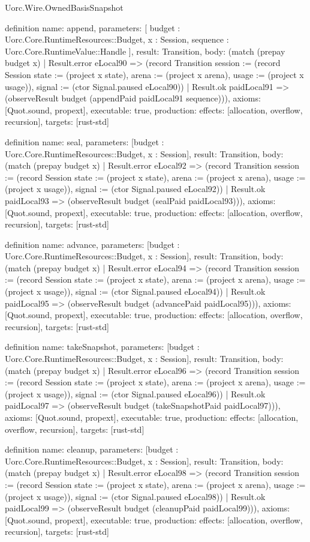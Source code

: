 \begin{lexlean}{Uorc.Wire.OwnedBasisSnapshot}
\begin{semanticmodule}
definition{
  name: append,
  parameters: [
    budget : Uorc.Core.RuntimeResources::Budget,
    x : Session,
    sequence : Uorc.Core.RuntimeValue::Handle
  ],
  result: Transition,
  body: (match (prepay budget x)
    | Result.error eLocal90 => (record Transition {session := (record Session {state := (project x state), arena := (project x arena), usage := (project x usage)}), signal := (ctor Signal.paused eLocal90)})
    | Result.ok paidLocal91 => (observeResult budget (appendPaid paidLocal91 sequence))),
  axioms: [Quot.sound, propext],
  executable: true,
  production: {effects: [allocation, overflow, recursion], targets: [rust-std]}
}

definition{
  name: seal,
  parameters: [budget : Uorc.Core.RuntimeResources::Budget, x : Session],
  result: Transition,
  body: (match (prepay budget x)
    | Result.error eLocal92 => (record Transition {session := (record Session {state := (project x state), arena := (project x arena), usage := (project x usage)}), signal := (ctor Signal.paused eLocal92)})
    | Result.ok paidLocal93 => (observeResult budget (sealPaid paidLocal93))),
  axioms: [Quot.sound, propext],
  executable: true,
  production: {effects: [allocation, overflow, recursion], targets: [rust-std]}
}

definition{
  name: advance,
  parameters: [budget : Uorc.Core.RuntimeResources::Budget, x : Session],
  result: Transition,
  body: (match (prepay budget x)
    | Result.error eLocal94 => (record Transition {session := (record Session {state := (project x state), arena := (project x arena), usage := (project x usage)}), signal := (ctor Signal.paused eLocal94)})
    | Result.ok paidLocal95 => (observeResult budget (advancePaid paidLocal95))),
  axioms: [Quot.sound, propext],
  executable: true,
  production: {effects: [allocation, overflow, recursion], targets: [rust-std]}
}

definition{
  name: takeSnapshot,
  parameters: [budget : Uorc.Core.RuntimeResources::Budget, x : Session],
  result: Transition,
  body: (match (prepay budget x)
    | Result.error eLocal96 => (record Transition {session := (record Session {state := (project x state), arena := (project x arena), usage := (project x usage)}), signal := (ctor Signal.paused eLocal96)})
    | Result.ok paidLocal97 => (observeResult budget (takeSnapshotPaid paidLocal97))),
  axioms: [Quot.sound, propext],
  executable: true,
  production: {effects: [allocation, overflow, recursion], targets: [rust-std]}
}

definition{
  name: cleanup,
  parameters: [budget : Uorc.Core.RuntimeResources::Budget, x : Session],
  result: Transition,
  body: (match (prepay budget x)
    | Result.error eLocal98 => (record Transition {session := (record Session {state := (project x state), arena := (project x arena), usage := (project x usage)}), signal := (ctor Signal.paused eLocal98)})
    | Result.ok paidLocal99 => (observeResult budget (cleanupPaid paidLocal99))),
  axioms: [Quot.sound, propext],
  executable: true,
  production: {effects: [allocation, overflow, recursion], targets: [rust-std]}
}


\end{semanticmodule}
\end{lexlean}
